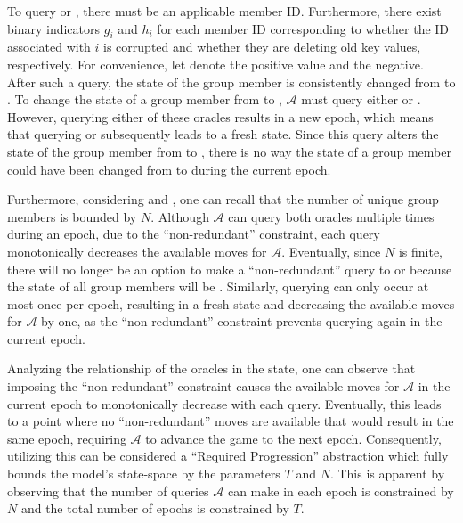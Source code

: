 \documentclass[runningheads]{llncs}
\newcommand{\Adversary}{\ensuremath{\mathcal{A}}\xspace}
\begin{document}
To query  or , there must be an applicable member ID.
Furthermore, there exist binary indicators $g_{i}$ and $h_{i}$ for each member ID corresponding to whether the ID associated with $i$ is corrupted and whether they are deleting old key values, respectively.
For convenience, let \True denote the positive value and \False the negative.
After such a query, the state of the group member is consistently changed from \True to \False.
To change the state of a group member from \False to \True, \Adversary must query either  or .
However, querying either of these oracles results in a new epoch, which means that querying  or  subsequently leads to a fresh state.
Since this query alters the state of the group member from \True to \False, there is no way the state of a group member could have been changed from \False to \True during the current epoch.

Furthermore, considering  and , one can recall that the number of unique group members is bounded by $N$.
Although \Adversary can query both oracles multiple times during an epoch, due to the ``non-redundant'' constraint, each query monotonically decreases the available moves for \Adversary.
Eventually, since $N$ is finite, there will no longer be an option to make a ``non-redundant'' query to  or  because the state of all group members will be \False.
Similarly, querying  can only occur at most once per epoch, resulting in a fresh state and decreasing the available moves for \Adversary by one, as the ``non-redundant'' constraint prevents querying  again in the current epoch.

Analyzing the relationship of the oracles in the \CGKAsec state, one can observe that imposing the ``non-redundant'' constraint causes the available moves for \Adversary in the current epoch to monotonically decrease with each query.
Eventually, this leads to a point where no ``non-redundant'' moves are available that would result in the same epoch, requiring \Adversary to advance the game to the next epoch.
Consequently, utilizing this can be considered a ``Required Progression''  abstraction which fully bounds the model's state-space by the parameters $T$ and $N$.
This is apparent by observing that the number of queries \Adversary can make in each epoch is constrained by $N$ and the total number of epochs is constrained by $T$.
\end{document}
